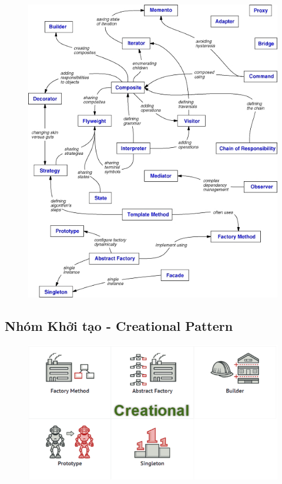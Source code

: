 \documentclass{article}
\begin{document}
\begin{itemize}
\begin{figure}[htp]
\begin{center}
                \includegraphics[scale=0.65]{./image/design-patterns-relationship.jpg}
            \end{center}
        \end{figure}
    \end{itemize}
    \pagebreak
    \begin{center}
        \hspace{0pt}
        \vfill
        \fontsize{30}{20}\selectfont\part{Nhóm Khởi tạo - Creational Pattern}
        \begin{figure}[htp]
            \begin{center}
                \includegraphics[scale=0.65]{./image/creational-pattern.png}
            \end{center}
        \end{figure}
        \vfill
        \hspace{0pt}
    \end{center}
\end{document}

